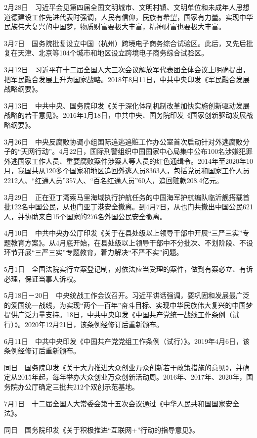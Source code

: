 \documentclass[10pt,a4paper,twocolumn]{book}
\begin{document}
2月28日　习近平会见第四届全国文明城市、文明村镇、文明单位和未成年人思想道德建设工作先进代表时强调，人民有信仰，民族有希望，国家有力量。实现中华民族伟大复兴的中国梦，物质财富要极大丰富，精神财富也要极大丰富。

3月7日　国务院批复设立中国（杭州）跨境电子商务综合试验区。此后，又先后批复在天津、北京等104个城市和地区设立跨境电子商务综合试验区。

3月12日　习近平在十二届全国人大三次会议解放军代表团全体会议上明确提出，把军民融合发展上升为国家战略。2018年8月11日，中共中央印发《军民融合发展战略纲要》。

3月13日　中共中央、国务院印发《关于深化体制机制改革加快实施创新驱动发展战略的若干意见》。2016年1月18日，中共中央、国务院印发《国家创新驱动发展战略纲要》。

3月26日　中央反腐败协调小组国际追逃追赃工作办公室首次启动针对外逃腐败分子的“天网行动”。4月22日，国际刑警组织中国国家中心局集中公布100名涉嫌犯罪外逃国家工作人员、重要腐败案件涉案人等人员的红色通缉令。2014年至2020年10月，我国共从120多个国家和地区追回外逃人员8363人，包括党员和国家工作人员2212人、“红通人员”357人、“百名红通人员”60人，追回赃款208.4亿元。

3月29日　正在亚丁湾索马里海域执行护航任务的中国海军护航编队临沂舰搭载首批122名中国公民，从也门亚丁港安全撤离。到4月7日，从也门共撤出中国公民621人，并协助来自15个国家的276名外国公民安全撤离。

4月10日　中共中央办公厅印发《关于在县处级以上领导干部中开展“三严三实”专题教育方案》。从4月底开始，在县处级以上领导干部中不分批次、不划阶段、不设环节开展“三严三实”专题教育，着力解决“不严不实”问题。

5月1日　全国法院实行立案登记制，对依法应当受理的案件，做到有案必立、有诉必理，保证当事人诉权。

5月18日－20日　中央统战工作会议召开。习近平讲话强调，要巩固和发展最广泛的爱国统一战线，为实现“两个一百年”奋斗目标、实现中华民族伟大复兴的中国梦提供广泛力量支持。18日，中共中央印发《中国共产党统一战线工作条例（试行）》。2020年12月21日，该条例经修订后重新颁布。

6月11日　中共中央印发《中国共产党党组工作条例（试行）》。2019年4月6日，该条例经修订后重新颁布。

同日　国务院印发《关于大力推进大众创业万众创新若干政策措施的意见》，并确定从2015年起，每年举办大众创业万众创新活动周。2016年、2017年、2020年，国务院办公厅确定三批共212个双创示范基地。

7月1日　十二届全国人大常委会第十五次会议通过《中华人民共和国国家安全法》。

同日　国务院印发《关于积极推进“互联网+”行动的指导意见》。
\end{document}
